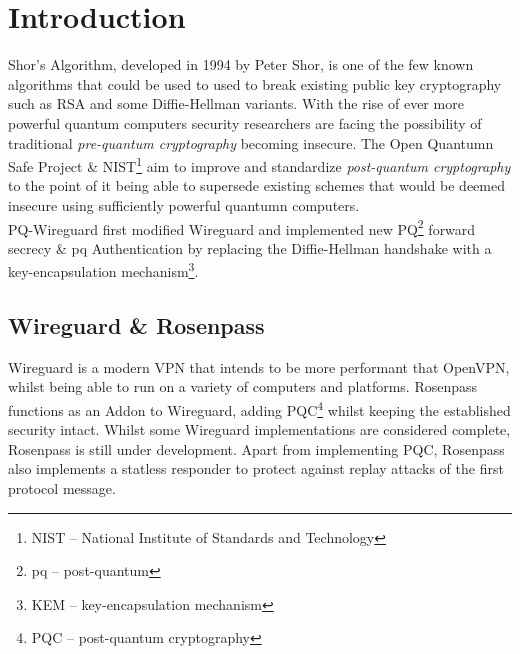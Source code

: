 \documentclass[sigconf]{acmart}
\begin{document}

\maketitle


\section{Introduction}
Shor's Algorithm, developed in 1994 by Peter Shor, is one of the few known algorithms that could be used to used to break existing public key cryptography such as RSA and some Diffie-Hellman variants. With the rise of ever more powerful quantum computers security researchers are facing the possibility of traditional \textit{pre-quantum cryptography} becoming insecure. The Open Quantumn Safe Project\cite{open-quantum-safe} \& NIST\footnote{NIST -- National Institute of Standards and Technology} aim to improve and standardize \textit{post-quantum cryptography} to the point of it being able to supersede existing schemes that would be deemed insecure using sufficiently powerful quantumn computers. \\
PQ-Wireguard\cite{cryptoeprint:2020/379} first modified Wireguard and implemented new PQ\footnote{pq -- post-quantum} forward secrecy \& pq Authentication by replacing the Diffie-Hellman handshake with a key-encapsulation mechanism\footnote{KEM -- key-encapsulation mechanism}.

\subsection{Wireguard \& Rosenpass}
Wireguard is a modern VPN that intends to be more performant that OpenVPN, whilst being able to run on a variety of computers and platforms\cite{Wireguard}. Rosenpass functions as an Addon to Wireguard, adding PQC\footnote{PQC -- post-quantum cryptography} whilst keeping the established security intact. Whilst some Wireguard implementations are considered complete\cite{wireguard-repos}, Rosenpass is still under development\cite{rosenpass}. Apart from implementing PQC, Rosenpass also implements a statless responder to protect against replay attacks of the first protocol message.
\end{document}
